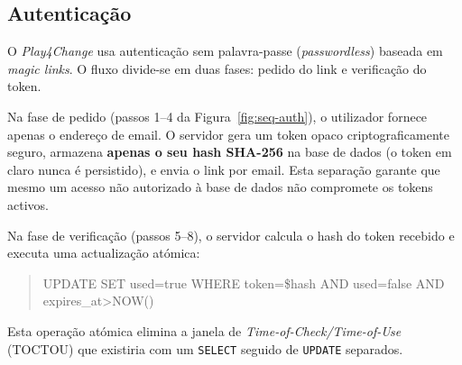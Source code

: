 \subsection{Autentica\c{c}\~ao}
\label{ssec:seq-auth}

O \emph{Play4Change} usa autentica\c{c}\~ao sem palavra-passe (\emph{passwordless})
baseada em \emph{magic links}. O fluxo divide-se em duas fases: pedido do link
e verifica\c{c}\~ao do token.

Na fase de pedido (passos 1--4 da Figura~\ref{fig:seq-auth}), o utilizador
fornece apenas o endere\c{c}o de email. O servidor gera um token opaco
criptograficamente seguro, armazena \textbf{apenas o seu hash SHA-256} na
base de dados (o token em claro nunca \'e persistido), e envia o link por
email. Esta separa\c{c}\~ao garante que mesmo um acesso n\~ao autorizado \`a
base de dados n\~ao compromete os tokens activos.

Na fase de verifica\c{c}\~ao (passos 5--8), o servidor calcula o hash do
token recebido e executa uma actualiza\c{c}\~ao at\'omica:
\begin{quote}
\footnotesize\ttfamily UPDATE SET used=true WHERE token=\$hash AND used=false AND expires\_at>NOW()
\end{quote}
Esta opera\c{c}\~ao at\'omica elimina a janela de
\emph{Time-of-Check/Time-of-Use} (TOCTOU) que existiria com um
\texttt{SELECT} seguido de \texttt{UPDATE} separados.

